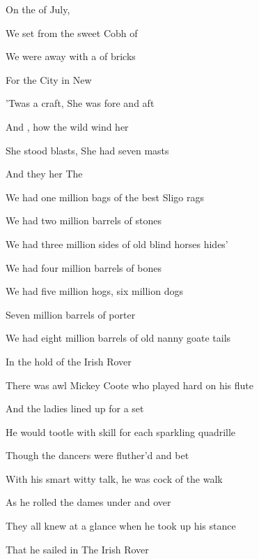 \begin{SBVerse*}
On the  of July, 

We set  from the sweet Cobh of 

We were  away with a  of bricks

For the  City  in New 

'Twas a  craft, She was  fore and aft

And , how the wild wind  her

She stood  blasts, She had  seven masts

And they  her The  
\end{SBVerse*}

\bigskip

\bigskip

\bigskip

We had one million bags of the best Sligo rags

We had two million barrels of stones

We had three million sides of old blind horses hides'

We had four million barrels of bones

We had five million hogs, six million dogs

Seven million barrels of porter

We had eight million barrels of old nanny goate tails

In the hold of the Irish Rover

\bigskip

\bigskip

There was awl Mickey Coote who played hard on his flute

And the ladies lined up for a set

He would tootle with skill for each sparkling quadrille

Though the dancers were fluther'd and bet

With his smart witty talk, he was cock of the walk

As he rolled the dames under and over

They all knew at a glance when he took up his stance

That he sailed in The Irish Rover

\bigskip

\bigskip


